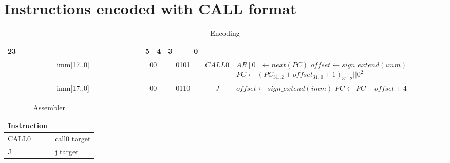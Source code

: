 \section{Instructions encoded with CALL format}
\begin{smalltables}
	\begin{longtable}{llllllllllllllllllllllll  p{1cm}  p{7cm} | }
		\caption{Encoding\label{long}}\\
		23 & & & & & & & & & & & & & & & & & & 5 & 4 & 3 & & & 0 & &
		\multicolumn{1}{c}{}\\
		\hline
		\multicolumn{18}{|c|}{imm[17..0]} & \multicolumn{2}{c|}{00} & \multicolumn{4}{c|}{0101} & \multicolumn{1}{c|}{$CALL0$} & $AR[0] \leftarrow next(PC)$ \newline $offset \leftarrow sign\_extend(imm)$ \newline $PC \leftarrow (PC_{31..2}+offset_{31..0}+1)_{31..2}||0^2$\\ \hline
		\multicolumn{18}{|c|}{imm[17..0]} & \multicolumn{2}{c|}{00} & \multicolumn{4}{c|}{0110} & \multicolumn{1}{c|}{$J$} & $offset \leftarrow sign\_extend(imm)$ \newline $PC \leftarrow PC + offset + 4$\\ \hline
	\end{longtable}


	\begin{longtable}{|p{5cm}|p{5cm}|}
		\caption{Assembler\label{long}}\\
		\hline
		Instruction & \\
		\hline
		CALL0 & call0 target\\ \hline
		J & j target\\ \hline
	\end{longtable}
\end{smalltables}